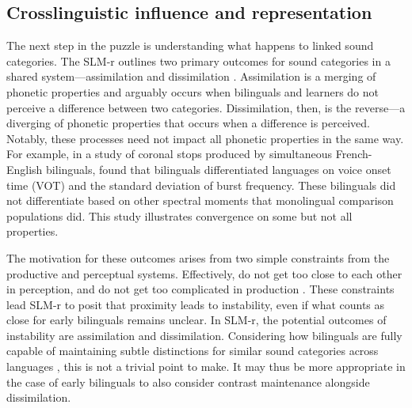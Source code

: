 \subsection{Crosslinguistic influence and representation}\label{ch4:sec:cli}

The next step in the puzzle is understanding what happens to linked sound categories. The SLM-r outlines two primary outcomes for sound categories in a shared system---assimilation and dissimilation \citep{flege_2021_slmr}. Assimilation is a merging of phonetic properties and arguably occurs when bilinguals and learners do not perceive a difference between two categories. Dissimilation, then, is the reverse---a diverging of phonetic properties that occurs when a difference is perceived. Notably, these processes need not impact all phonetic properties in the same way. For example, in a study of coronal stops produced by simultaneous French-English bilinguals, \citet{sundara_2006_production} found that bilinguals differentiated languages on voice onset time (VOT) and the standard deviation of burst frequency. These bilinguals did not differentiate based on other spectral moments that monolingual comparison populations did. This study illustrates convergence on some but not all properties. 

The motivation for these outcomes arises from two simple constraints from the productive and perceptual systems. Effectively, do not get too close to each other in perception, and do not get too complicated in production \citep{guion_2003_systems, lindblom_1988_universals, flege_2021_slmr}. These constraints lead SLM-r to posit that proximity leads to instability, even if what counts as close for early bilinguals remains unclear. In SLM-r, the potential outcomes of instability are assimilation and dissimilation. Considering how bilinguals are fully capable of maintaining subtle distinctions for similar sound categories across languages \citep[e.g.,][]{sundara_2006_production, lein_2016_vot, casillas_2021_interlingual}, this is not a trivial point to make. It may thus be more appropriate in the case of early bilinguals to also consider contrast maintenance alongside dissimilation. 


